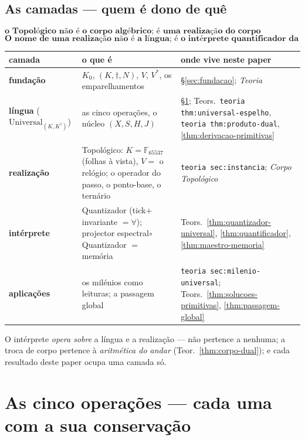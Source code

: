 \documentclass[11pt,a4paper]{article}
\newcommand{\code}[1]{\texttt{\small #1}}
\newcommand{\leitura}[1]{\code{#1}}
\begin{document}
\subsection*{As camadas --- quem é dono de quê}\label{sec:camadas-operacoes}

\[
\boxed{\textbf{o Topológico não é o corpo algébrico; é uma realização
do corpo algébrico.}}
\]
\[
\boxed{\textbf{O nome de uma realização não é a língua; é o
intérprete quantificador da língua nessa realização.}}
\]
\begin{center}\small
\begin{tabular}{@{}lll@{}}
\toprule
camada & o que é & onde vive neste paper \\
\midrule
\textbf{fundação} & $K_{0}$, $(K,\dagger,N)$, $V$, $V^{*}$, os
  emparelhamentos & \S\ref{sec:fundacao}; \emph{Teoria} \\
\textbf{língua} ($\mathrm{Universal}_{(K,K^{\dagger})}$) & as cinco
  operações, o núcleo $(X,S,H,J)$ &
  \S\ref{sec:cinco}; Teors.~\leitura{teoria thm:universal-espelho},
  \leitura{teoria thm:produto-dual}, \ref{thm:derivacao-primitivas} \\
\textbf{realização} & Topológico: $K=\mathbb{F}_{65537}$ (folhas à vista),
  $V=$ o relógio; o operador do passo, o ponto-base, o ternário &
  \leitura{teoria sec:instancia}; \emph{Corpo Topológico} \\
\textbf{intérprete} & Quantizador (tick$+$invariante $=\forall$);
  projector espectral$\circ$Quantizador $=$ memória &
  Teors.~\ref{thm:quantizador-universal}, \ref{thm:quantificador},
  \ref{thm:maestro-memoria} \\
\textbf{aplicações} & os milénios como leituras; a passagem global &
  \leitura{teoria sec:milenio-universal}; Teors.~\ref{thm:solucoes-primitivas},
  \ref{thm:passagem-global} \\
\bottomrule
\end{tabular}
\end{center}
\noindent O intérprete \emph{opera sobre} a língua e a realização ---
não pertence a nenhuma; a troca de corpo pertence à \emph{aritmética
do andar} (Teor.~\ref{thm:corpo-dual}); e cada resultado deste paper
ocupa uma camada só.

\section{As cinco operações --- cada uma com a sua conservação}\label{sec:cinco}
\end{document}
